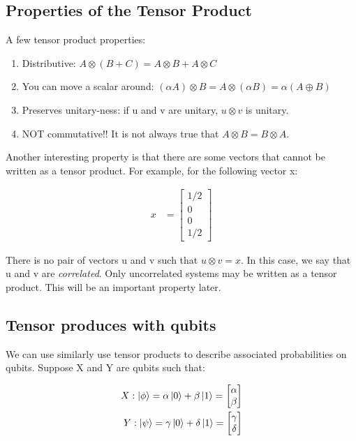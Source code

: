 \documentclass[11pt]{article}
\begin{document}
\subsection {Properties of the Tensor Product}

A few tensor product properties:

\begin{enumerate}
	\item 
	Distributive: $A \otimes (B + C) = A \otimes B + A \otimes C$
	\item
	You can move a scalar around: $(\alpha A) \otimes B = A \otimes (\alpha B) = \alpha(A \oplus B)$
	\item
	Preserves unitary-ness: if u and v are unitary, $u \otimes v$ is unitary.
	\item 
	NOT commutative!! It is not always true that $A \otimes B = B \otimes A$.	
\end{enumerate}
Another interesting property is that there are some vectors that cannot be written as a tensor product. For example, for the following vector x: 

\begin {align}
x &= \begin{bmatrix}
	1/2 \\ 
	0 \\
	0 \\
	1/2
\end{bmatrix}
\end{align}

There is no pair of vectors u and v such that $u \otimes v = x$. In this case, we say that u and v are \textit{correlated}. Only uncorrelated systems may be written as a tensor product. This will be an important property later.

\subsection{Tensor produces with qubits}

We can use similarly use tensor products to describe associated probabilities on qubits. Suppose X and Y are qubits such that: 

\begin {align}
X: \ket{\phi} = \alpha \ket{0} + \beta \ket{1} =	\begin{bmatrix}
	\alpha \\
	\beta
\end{bmatrix} \\
Y: \ket{\psi} = \gamma \ket{0} + \delta \ket{1} =	\begin{bmatrix}
	\gamma \\
	\delta
\end{bmatrix}
\end{align}
\end{document}
